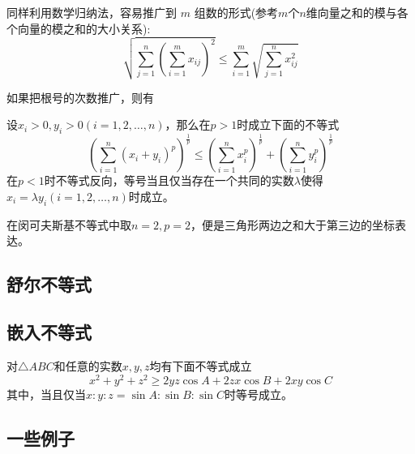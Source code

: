 同样利用数学归纳法，容易推广到 $m$ 组数的形式(参考$m$个$n$维向量之和的模与各个向量的模之和的大小关系):
\[ \sqrt{\sum_{j=1}^n(\sum_{i=1}^mx_{ij})^2} \leqslant \sum_{i=1}^m \sqrt{\sum_{j=1}^nx_{ij}^2}  \]

如果把根号的次数推广，则有
\begin{theorem}[闵可夫斯基不等式]
  设$x_i>0, y_i>0 (i=1,2,\ldots,n)$，那么在$p>1$时成立下面的不等式
  \begin{equation}
    \label{eq:minkowski-inequation}
    \left( \sum_{i=1}^n(x_i+y_i)^p \right)^{\frac{1}{p}} \leqslant \left( \sum_{i=1}^nx_i^p \right)^{\frac{1}{p}} + \left( \sum_{i=1}^ny_i^p \right)^{\frac{1}{p}}
  \end{equation}
  在$p<1$时不等式反向，等号当且仅当存在一个共同的实数$\lambda$使得$x_i=\lambda y_i(i=1,2,\ldots,n)$时成立。
\end{theorem}
在闵可夫斯基不等式中取$n=2,p=2$，便是三角形两边之和大于第三边的坐标表达。

\subsection{舒尔不等式}
\label{sec:schur-inequality}



\subsection{嵌入不等式}
\label{sec:embedding-inequality}

\begin{theorem}[嵌入不等式]
  对$\triangle ABC$和任意的实数$x,y,z$均有下面不等式成立
  \begin{equation}
    \label{eq:embedding-inequation}
    x^2+y^2+z^2 \geqslant 2yz\cos{A}+2zx\cos{B}+2xy\cos{C}
  \end{equation}
  其中，当且仅当$x:y:z = \sin{A} : \sin{B} : \sin{C}$时等号成立。
\end{theorem}

\subsection{一些例子}
\label{sec:some-inequality-example}

